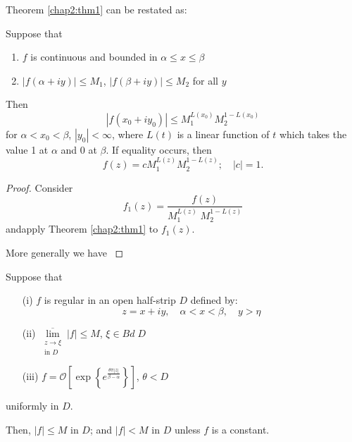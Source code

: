 Theorem \ref{chap2:thm1} can be restated as:

\medskip
{}  Suppose that 
\begin{enumerate}
\renewcommand{\theenumi}{\roman{enumi}}
\renewcommand{\labelenumi}{(\theenumi)}
\item $f$ is continuous and bounded in $\alpha \leq x \leq \beta$

\item $|f(\alpha + iy)| \leq M_1$, $|f(\beta + iy)| \leq M_2$ for all
  $y$ 
\end{enumerate}

Then
$$
|f(x_0 + iy_0)| \leq M^{L(x_0)}_1 M^{1-L(x_0)}_2
$$
for $\alpha < x_0 < \beta$, $|y_0| < \infty$, where $L(t)$ is a linear
function of $t$ which takes the value 1 at $\alpha$ and 0 at
$\beta$. If equality occurs, then 
$$
f(z) = c M^{L(z)}_1 M^{1-L(z)}_2; \quad |c|=1.
$$

\begin{proof}
Consider
$$
f_1 (z) = \frac{f(z)}{M^{L(z)}_1 \; M^{1-L(z)}_2}
$$
and\pageoriginale apply Theorem \ref{chap2:thm1} to $f_1(z)$.

More generally we have \cite[p.107]{key12}
\end{proof}

\begin{thm}\label{chap2:thm2}
Suppose that
\begin{itemize}
\item[(i)] $f$ is regular in an open half-strip $D$ defined by:
$$
z = x + iy, \quad \alpha < x < \beta, \quad y > \eta
$$

\item[(ii)] $\overline{\lim\limits_{\substack{z \to \xi\\ \text{in
      }D}}} |f| \leq M$,  $\xi \in Bd \; D$

\item[(iii)] $f = \mathcal{O} \left[ \exp \left\{e^{\frac{\theta \pi |z|}{\beta
    - \alpha}} \right\}\right]$, $\theta < D$
\end{itemize}
uniformly in $D$.

Then, $|f| \leq M$ in $D$; and $|f|<M$ in $D$ unless $f$ is a constant.
\end{thm}

